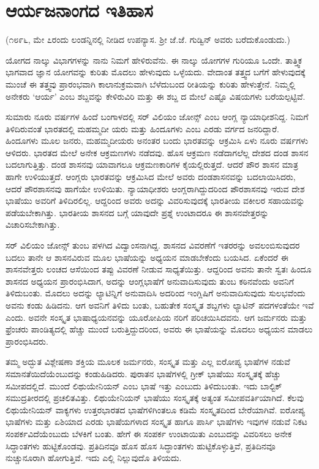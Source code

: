 
\chapter{ಆರ್ಯಜನಾಂಗದ ಇತಿಹಾಸ}

(೧೮೯೬, ಮೇ ೭ರಂದು ಲಂಡನ್ನಿನಲ್ಲಿ ನೀಡಿದ ಉಪನ್ಯಾಸ. ಶ‍್ರೀ ಜೆ.ಜೆ. ಗುಡ್ವಿನ್ ಅವರು ಬರೆದುಕೊಂಡುದು.)

ಯೋಗದ ನಾಲ್ಕು ವಿಭಾಗಗಳನ್ನು ನಾನು ನಿಮಗೆ ಹೇಳಿರುವೆನು. ಈ ನಾಲ್ಕು ಯೋಗಗಳ ಗುರಿಯೂ ಒಂದೇ. ತಾತ್ತ್ವಿಕ ಭಾಗವಾದ ಜ್ಞಾನ ಯೋಗವನ್ನು ಕುರಿತು ಮೊದಲು ಹೇಳುವುದು ಒಳ್ಳೆಯದು. ವೇದಾಂತ ತತ್ತ್ವದ ಬಗೆಗೆ ಹೇಳುವುದಕ್ಕೆ ಮುಂಚೆ ಈ ತತ್ತ್ವವು ಪ್ರಾರಂಭವಾಗಿ ಕಾಲಾನುಕ್ರಮವಾಗಿ ಬೆಳೆದುಬಂದ ರೀತಿಯನ್ನು ಕುರಿತು ಹೇಳುತ್ತೇನೆ. ನಿಮ್ಮಲ್ಲಿ ಅನೇಕರು ‘ಆರ್ಯ’ ಎಂಬ ಶಬ್ದವನ್ನು ಕೇಳಿರುವಿರಿ ಮತ್ತು ಈ ಶಬ್ದ ದ ಮೇಲೆ ಎಷ್ಟೊ ವಿಷಯಗಳು ಬರೆಯಲ್ಪಟ್ಟಿವೆ.

ಸುಮಾರು ನೂರು ವರ್ಷಗಳ ಹಿಂದೆ ಬಂಗಾಳದಲ್ಲಿ ಸರ್ ವಿಲಿಯಂ ಜೋನ್ಸ್ ಎಂಬ ಆಂಗ್ಲ ನ್ಯಾಯಾಧೀಶನಿದ್ದ. ನಿಮಗೆ ತಿಳಿದಿರುವಂತೆ ಭಾರತದಲ್ಲಿ ಮಹಮ್ಮದೀ ಯರು ಮತ್ತು ಹಿಂದೂಗಳು ಎಂಬ ಎರಡು ವರ್ಗದ ಜನರಿದ್ದಾರೆ. ಹಿಂದೂಗಳು ಮೂಲ ಜನರು, ಮಹಮ್ಮದೀಯರು ಅನಂತರ ಬಂದು ಭಾರತವನ್ನು ಆಕ್ರಮಿಸಿ ಏಳು ನೂರು ವರ್ಷಗಳು ಆಳಿದರು. ಭಾರತದ ಮೇಲೆ ಅನೇಕ ಆಕ್ರಮಣಗಳು ನಡೆದವು. ಹೊಸ ಆಕ್ರಮಣ ನಡೆದಾಗಲೆಲ್ಲ ದೇಶದ ದಂಡ ಶಾಸನ ಬದಲಾಗುತ್ತಿತ್ತು. ದಂಡ ಶಾಸನವು ಯಾವಾಗಲೂ ಆಕ್ರಮಣಕಾರಿಗಳ ಕೈಯಲ್ಲಿರುತ್ತದೆ. ಆದರೆ ಪೌರ ಶಾಸನ ಮಾತ್ರ ಹಾಗೇ ಉಳಿಯುತ್ತದೆ. ಆಂಗ್ಲರು ಭಾರತವನ್ನು ಆಕ್ರಮಿಸಿದ ಮೇಲೆ ಅವರು ದಂಡಶಾಸನವನ್ನು ಬದಲಾಯಿಸಿದರು, ಆದರೆ ಪೌರಶಾಸನವು ಹಾಗೆಯೇ ಉಳಿಯಿತು. ನ್ಯಾಯಾಧೀಶರು ಆಂಗ್ಲರಾಗಿದ್ದುದರಿಂದ ಪೌರಶಾಸನವು ಇರುವ ದೇಶ ಭಾಷೆಯು ಅವರಿಗೆ ತಿಳಿದಿರಲಿಲ್ಲ. ಆದ್ದರಿಂದ ಅವರು ಅದನ್ನು ವಿವರಿಸುವುದಕ್ಕೆ ಭಾರತೀಯ ವಕೀಲರ ಸಹಾಯವನ್ನು ಪಡೆಯಬೇಕಾಗಿತ್ತು. ಭಾರತೀಯ ಶಾಸನದ ಬಗ್ಗೆ ಯಾವುದೇ ಪ್ರಶ್ನೆ ಉಂಟಾದರೂ ಈ ಶಾಸನವೇತ್ತರನ್ನು ವಿಚಾರಿಸಬೇಕಾಗಿತ್ತು.

ಸರ್ ವಿಲಿಯಂ ಜೋನ್ಸ್ ತುಂಬ ಪಳಗಿದ ವಿದ್ವಾಂಸನಾಗಿದ್ದ. ಶಾಸನದ ವಿವರಣೆಗೆ ಇತರರನ್ನು ಅವಲಂಬಿಸುವುದರ ಬದಲು ತಾನೇ ಆ ಶಾಸನವಿರುವ ಮೂಲ ಭಾಷೆಯನ್ನು ಅಧ್ಯಯನ ಮಾಡಬೇಕೆಂದು ಬಯಸಿದ. ಏಕೆಂದರೆ ಈ ಶಾಸನವೇತ್ತರು ಲಂಚದ ಆಸೆಯಿಂದ ತಪ್ಪು ವಿವರಣೆ ನೀಡುವ ಸಾಧ್ಯತೆಯಿತ್ತು. ಆದ್ದರಿಂದ ಅವನು ತಾನೇ ಸ್ವತಃ ಹಿಂದೂ ಶಾಸನದ ಅಧ್ಯಯನ ಪ್ರಾರಂಭಿಸಿದಾಗ, ಅದನ್ನು ಆಂಗ್ಲಭಾಷೆಗೆ ಅನುವಾದಿಸುವುದು ತುಂಬ ಕಠಿನವೆಂದು ಅವನಿಗೆ ತಿಳಿದುಬಂತು. ಮೊದಲು ಅದನ್ನು ಲ್ಯಾಟಿನ್ನಿಗೆ ಅನುವಾದಿಸಿ ಅದರಿಂದ ಇಂಗ್ಲಿಷಿಗೆ ಅನುವಾದಿಸುವುದು ಸುಲಭವೆಂದು ಅವನು ಕಂಡು ಹಿಡಿದನು. ಆಗ ಅವನಿಗೆ ತಿಳಿದು ಬಂತು, ಬಹುತೇಕ ಸಂಸ್ಕೃತ ಶಬ್ದಗಳು ಲ್ಯಾಟಿನ್ ಪದಗಳಂತೆಯೇ ಇವೆ ಎಂದು. ಅವನೇ ಸಂಸ್ಕೃತ ಭಾಷಾಧ್ಯಯನವನ್ನು ಯೂರೋಪಿಯ ನರಿಗೆ ಪರಿಚಯಿಸಿದವನು. ಆಗ ಜರ್ಮನರು ಮತ್ತು ಫ್ರೆಂಚರು ಪಾಂಡಿತ್ಯದಲ್ಲಿ ಹೆಚ್ಚು ಮುಂದೆ ಬರುತ್ತಿದ್ದುದರಿಂದ, ಅವರು ಈ ಭಾಷೆಯನ್ನು ಮೊದಲು ಅಧ್ಯಯನ ಮಾಡಲು ಪ್ರಾರಂಭಿಸಿದರು.

ತಮ್ಮ ಅದ್ಭುತ ವಿಶ್ಲೇಷಣಾ ಶಕ್ತಿಯ ಮೂಲಕ ಜರ್ಮನರು, ಸಂಸ್ಕೃತ ಮತ್ತು ಎಲ್ಲ ಐರೋಪ್ಯ ಭಾಷೆಗಳ ನಡುವೆ ಸಮಾನತೆಯಿದೆಯೆಂಬುದನ್ನು ಕಂಡುಹಿಡಿದರು. ಪುರಾತನ ಭಾಷೆಗಳಲ್ಲಿ ಗ್ರೀಕ್ ಭಾಷೆಯು ಸಂಸ್ಕೃತಕ್ಕೆ ಹೆಚ್ಚು ಸಮೀಪದಲ್ಲಿದೆ. ಮುಂದೆ ಲಿಥುಯೇನಿಯನ್ ಎಂಬ ಭಾಷೆ ಇತ್ತು ಎಂಬುದು ತಿಳಿದುಬಂತು. ಇದು ಬಾಲ್ಟಿಕ್ ಸಮುದ್ರತೀರದಲ್ಲಿ ಪ್ರಚಲಿತವಿತ್ತು. ಲಿಥುಯೇನಿಯನ್ ಭಾಷೆಯು ಸಂಸ್ಕೃತಕ್ಕೆ ಅತ್ಯಂತ ಸಮೀಪವರ್ತಿಯಾಗಿದೆ. ಕೆಲವು ಲಿಥುಯೇನಿಯನ್ ವಾಕ್ಯಗಳು ಉತ್ತರಭಾರತದ ಭಾಷೆಗಳಿಗಿಂತಲೂ ಕಡಿಮೆ ಸಂಸ್ಕೃತದಿಂದ ಬೇರೆಯಾಗಿವೆ. ಐರೋಪ್ಯ ಭಾಷೆಗಳು ಮತ್ತು ಏಶಿಯಾದ ಎರಡು ಭಾಷೆಯಗಳಾದ ಸಂಸ್ಕೃತ ಹಾಗೂ ಪಾರ್ಸಿ ಭಾಷೆಗಳು ಇವುಗಳ ನಡುವೆ ನಿಕಟ ಸಂಪರ್ಕವಿದೆಯೆಂಬುದು ಬೆಳಕಿಗೆ ಬಂತು. ಹೇಗೆ ಈ ಸಂಪರ್ಕ ಉಂಟಾಯಿತು ಎಂಬುದನ್ನು ವಿವರಿಸಲು ಅನೇಕ ಸಿದ್ಧಾಂತಗಳು ಹುಟ್ಟಿಕೊಂಡವು. ಪ್ರತಿದಿನವೂ ಹೊಸ ಹೊಸ ಸಿದ್ಧಾಂತಗಳು ಹುಟ್ಟಿಕೊಳ್ಳುತ್ತಿವೆ, ಪ್ರತಿದಿನವೂ ನುಚ್ಚುನೂರಾಗಿ ಹೋಗುತ್ತಿವೆ. ಇದು ಎಲ್ಲಿ ನಿಲ್ಲುವುದೊ ತಿಳಿಯದು.

